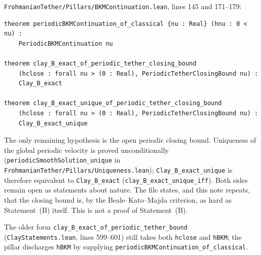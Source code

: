 \documentclass[11pt]{article}
\theoremstyle{plain}
\theoremstyle{definition}
\theoremstyle{remark}
\begin{document}
\texttt{FrohmanianTether/\hspace{0pt}Pillars/\hspace{0pt}BKMContinuation.\hspace{0pt}lean}, lines 145 and 171--179:
\begin{lstlisting}
theorem periodicBKMContinuation_of_classical {nu : Real} (hnu : 0 < nu) :
    PeriodicBKMContinuation nu

theorem clay_B_exact_of_periodic_tether_closing_bound
    (hclose : forall nu > (0 : Real), PeriodicTetherClosingBound nu) :
    Clay_B_exact

theorem clay_B_exact_unique_of_periodic_tether_closing_bound
    (hclose : forall nu > (0 : Real), PeriodicTetherClosingBound nu) :
    Clay_B_exact_unique
\end{lstlisting}
The only remaining hypothesis is the open periodic closing bound. Uniqueness of the global periodic velocity is proved unconditionally (\texttt{periodicSmoothSolution\_unique} in \texttt{FrohmanianTether/\hspace{0pt}Pillars/\hspace{0pt}Uniqueness.\hspace{0pt}lean}); \texttt{Clay\_\hspace{0pt}B\_\hspace{0pt}exact\_\hspace{0pt}unique} is therefore equivalent to \texttt{Clay\_\hspace{0pt}B\_\hspace{0pt}exact} (\texttt{clay\_\hspace{0pt}B\_\hspace{0pt}exact\_\hspace{0pt}unique\_\hspace{0pt}iff}). Both sides remain open as statements about nature. The file states, and this note repeats, that the closing bound is, by the Beale--Kato--Majda criterion, as hard as Statement~(B) itself. This is not a proof of Statement~(B).

The older form \texttt{clay\_\hspace{0pt}B\_\hspace{0pt}exact\_\hspace{0pt}of\_\hspace{0pt}periodic\_\hspace{0pt}tether\_\hspace{0pt}bound} (\texttt{ClayStatements.\hspace{0pt}lean}, lines 599--601) still takes both \texttt{hclose} and \texttt{hBKM}; the pillar discharges \texttt{hBKM} by supplying \texttt{periodicBKMContinuation\_\hspace{0pt}of\_\hspace{0pt}classical}.
\end{document}
